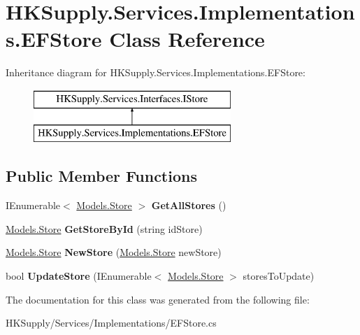 \hypertarget{class_h_k_supply_1_1_services_1_1_implementations_1_1_e_f_store}{}\section{H\+K\+Supply.\+Services.\+Implementations.\+E\+F\+Store Class Reference}
\label{class_h_k_supply_1_1_services_1_1_implementations_1_1_e_f_store}
Inheritance diagram for H\+K\+Supply.\+Services.\+Implementations.\+E\+F\+Store\+:\begin{figure}[H]
\begin{center}
\leavevmode
\includegraphics[height=2.000000cm]{class_h_k_supply_1_1_services_1_1_implementations_1_1_e_f_store}
\end{center}
\end{figure}
\subsection*{Public Member Functions}
\begin{DoxyCompactItemize}
\item 
\mbox{\label{class_h_k_supply_1_1_services_1_1_implementations_1_1_e_f_store_ae4b68dd27aa7153f55dfbfc3fb3e940f}} 
I\+Enumerable$<$ \mbox{\hyperlink{class_h_k_supply_1_1_models_1_1_store}{Models.\+Store}} $>$ {\bfseries Get\+All\+Stores} ()
\item 
\mbox{\label{class_h_k_supply_1_1_services_1_1_implementations_1_1_e_f_store_a528ad1b9410f30aaf17eb8e7134f8f68}} 
\mbox{\hyperlink{class_h_k_supply_1_1_models_1_1_store}{Models.\+Store}} {\bfseries Get\+Store\+By\+Id} (string id\+Store)
\item 
\mbox{\label{class_h_k_supply_1_1_services_1_1_implementations_1_1_e_f_store_a73de0913d4fdcf03f41bd65004c90aab}} 
\mbox{\hyperlink{class_h_k_supply_1_1_models_1_1_store}{Models.\+Store}} {\bfseries New\+Store} (\mbox{\hyperlink{class_h_k_supply_1_1_models_1_1_store}{Models.\+Store}} new\+Store)
\item 
\mbox{\label{class_h_k_supply_1_1_services_1_1_implementations_1_1_e_f_store_ae82f4be82d405b74217046960018b1c5}} 
bool {\bfseries Update\+Store} (I\+Enumerable$<$ \mbox{\hyperlink{class_h_k_supply_1_1_models_1_1_store}{Models.\+Store}} $>$ stores\+To\+Update)
\end{DoxyCompactItemize}


The documentation for this class was generated from the following file\+:\begin{DoxyCompactItemize}
\item 
H\+K\+Supply/\+Services/\+Implementations/E\+F\+Store.\+cs\end{DoxyCompactItemize}
